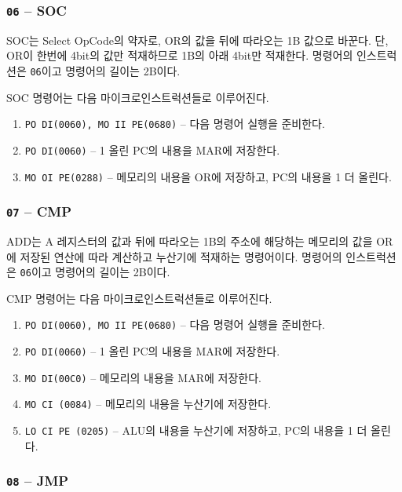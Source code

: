 \documentclass{article}
\begin{document}
\subsubsection{\texttt{06} -- SOC}

SOC는 Select OpCode의 약자로, OR의 값을 뒤에 따라오는 1B 값으로 바꾼다.
단, OR이 한번에 4bit의 값만 적재하므로 1B의 아래 4bit만 적재한다.
명령어의 인스트럭션은 \texttt{06}이고 명령어의 길이는 2B이다.

SOC 명령어는 다음 마이크로인스트럭션들로 이루어진다.

\begin{enumerate}
    \item \texttt{PO DI(0060), MO II PE(0680)} -- 다음 명령어 실행을 준비한다.
    \setcounter{enumi}{2}
    \item \texttt{PO DI(0060)} -- 1 올린 PC의 내용을 MAR에 저장한다.
    \item \texttt{MO OI PE(0288)} -- 메모리의 내용을 OR에 저장하고,
        PC의 내용을 1 더 올린다.
\end{enumerate}

\subsubsection{\texttt{07} -- CMP}

ADD는 A 레지스터의 값과 뒤에 따라오는 1B의 주소에 해당하는 메모리의 값을
OR에 저장된 연산에 따라 계산하고 누산기에 적재하는 명령어이다.
명령어의 인스트럭션은 \texttt{06}이고 명령어의 길이는 2B이다.

CMP 명령어는 다음 마이크로인스트럭션들로 이루어진다.

\begin{enumerate}
    \item \texttt{PO DI(0060), MO II PE(0680)} -- 다음 명령어 실행을 준비한다.
    \setcounter{enumi}{2}
    \item \texttt{PO DI(0060)} -- 1 올린 PC의 내용을 MAR에 저장한다.
    \item \texttt{MO DI(00C0)} -- 메모리의 내용을 MAR에 저장한다.
    \item \texttt{MO CI (0084)} -- 메모리의 내용을 누산기에 저장한다.
    \item \texttt{LO CI PE (0205)} -- ALU의 내용을 누산기에 저장하고,
        PC의 내용을 1 더 올린다.
\end{enumerate}

\subsubsection{\texttt{08} -- JMP}
\end{document}
